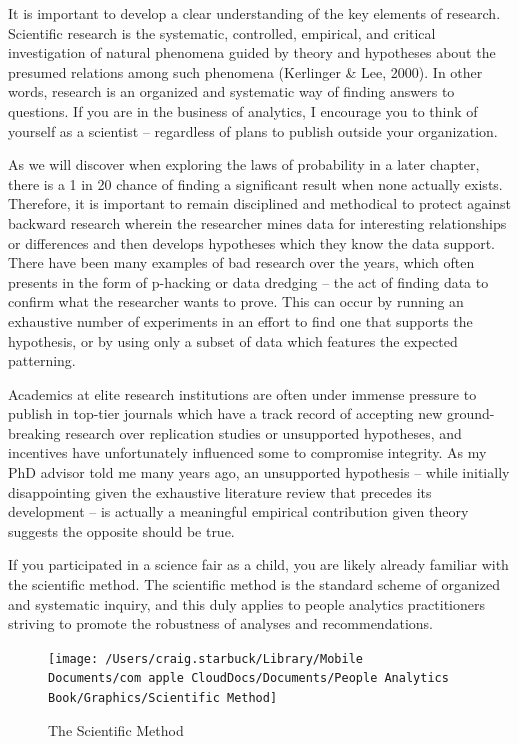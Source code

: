 \documentclass[]{book}
\begin{document}
It is important to develop a clear understanding of the key elements of research. Scientific research is the systematic, controlled, empirical, and critical investigation of natural phenomena guided by theory and hypotheses about the presumed relations among such phenomena (Kerlinger \& Lee, 2000). In other words, research is an organized and systematic way of finding answers to questions. If you are in the business of analytics, I encourage you to think of yourself as a scientist -- regardless of plans to publish outside your organization.

As we will discover when exploring the laws of probability in a later chapter, there is a 1 in 20 chance of finding a significant result when none actually exists. Therefore, it is important to remain disciplined and methodical to protect against backward research wherein the researcher mines data for interesting relationships or differences and then develops hypotheses which they know the data support. There have been many examples of bad research over the years, which often presents in the form of p-hacking or data dredging -- the act of finding data to confirm what the researcher wants to prove. This can occur by running an exhaustive number of experiments in an effort to find one that supports the hypothesis, or by using only a subset of data which features the expected patterning.

Academics at elite research institutions are often under immense pressure to publish in top-tier journals which have a track record of accepting new ground-breaking research over replication studies or unsupported hypotheses, and incentives have unfortunately influenced some to compromise integrity. As my PhD advisor told me many years ago, an unsupported hypothesis -- while initially disappointing given the exhaustive literature review that precedes its development -- is actually a meaningful empirical contribution given theory suggests the opposite should be true.

If you participated in a science fair as a child, you are likely already familiar with the scientific method. The scientific method is the standard scheme of organized and systematic inquiry, and this duly applies to people analytics practitioners striving to promote the robustness of analyses and recommendations.

\begin{figure}
\texttt{[image: /Users/craig.starbuck/Library/Mobile Documents/com~apple~CloudDocs/Documents/People Analytics Book/Graphics/Scientific Method]} \caption{The Scientific Method}\label{fig:unnamed-chunk-2}
\end{figure}
\end{document}
